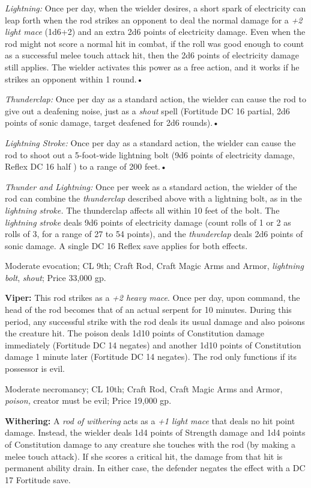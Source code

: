 \textit{Lightning: }Once per day, when the wielder desires, a short spark of electricity 
can leap forth when the rod strikes an opponent to deal the normal damage for a 
\textit{+2 light mace }(1d6+2) and an extra 2d6 points of electricity damage. Even 
when the rod might not score a normal hit in combat, if the roll was good enough 
to count as a successful melee touch attack hit, then the 2d6 points of electricity 
damage still applies. The wielder activates this power as a free action, and it 
works if he strikes an opponent within 1 round.•

\textit{Thunderclap: }Once per day as a standard action, the wielder can cause 
the rod to give out a deafening noise, just as a \textit{shout }spell (Fortitude 
DC 16 partial, 2d6 points of sonic damage, target deafened for 2d6 rounds).•

\textit{Lightning Stroke: }Once per day as a standard action, the wielder can cause 
the rod to shoot out a 5-foot-wide lightning bolt (9d6 points of electricity damage, 
Reflex DC 16 half ) to a range of 200 feet.•

\textit{Thunder and Lightning: }Once per week as a standard action, the wielder 
of the rod can combine the \textit{thunderclap }described above with a lightning 
bolt, as in the \textit{lightning stroke. }The thunderclap affects all within 10 
feet of the bolt. The \textit{lightning stroke }deals 9d6 points of electricity 
damage (count rolls of 1 or 2 as rolls of 3, for a range of 27 to 54 points), and 
the \textit{thunderclap }deals 2d6 points of sonic damage. A single DC 16 Reflex 
save applies for both effects.

Moderate evocation; CL 9th; Craft Rod, Craft Magic Arms and Armor, \textit{lightning 
bolt}, \textit{shout}; Price 33,000 gp.

\textbf{Viper:} This rod strikes as a \textit{+2 heavy mace}. Once per day, upon 
command, the head of the rod becomes that of an actual serpent for 10 minutes. 
During this period, any successful strike with the rod deals its usual damage and 
also poisons the creature hit. The poison deals 1d10 points of Constitution damage 
immediately (Fortitude DC 14 negates) and another 1d10 points of Constitution damage 
1 minute later (Fortitude DC 14 negates). The rod only functions if its possessor 
is evil.

Moderate necromancy; CL 10th; Craft Rod, Craft Magic Arms and Armor, \textit{poison, 
}creator must be evil; Price 19,000 gp.

\textbf{Withering:} A \textit{rod of withering }acts as a \textit{+1 light mace 
}that deals no hit point damage. Instead, the wielder deals 1d4 points of Strength 
damage and 1d4 points of Constitution damage to any creature she touches with the 
rod (by making a melee touch attack). If she scores a critical hit, the damage 
from that hit is permanent ability drain. In either case, the defender negates 
the effect with a DC 17 Fortitude save.

